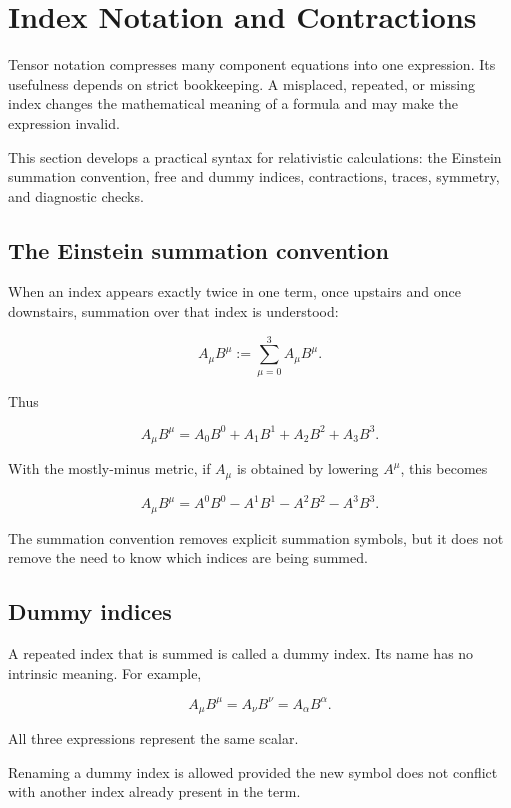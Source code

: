 \section{Index Notation and Contractions}
\label{sec:index_notation_and_contractions}

Tensor notation compresses many component equations into one expression. Its usefulness depends on strict bookkeeping. A misplaced, repeated, or missing index changes the mathematical meaning of a formula and may make the expression invalid.

This section develops a practical syntax for relativistic calculations: the Einstein summation convention, free and dummy indices, contractions, traces, symmetry, and diagnostic checks.

\subsection{The Einstein summation convention}

When an index appears exactly twice in one term, once upstairs and once downstairs, summation over that index is understood:

\[
A_{\mu}B^{\mu}
:=
\sum_{\mu=0}^{3}
A_{\mu}B^{\mu}.
\]

Thus

\[
A_{\mu}B^{\mu}
=
A_{0}B^{0}
+A_{1}B^{1}
+A_{2}B^{2}
+A_{3}B^{3}.
\]

With the mostly-minus metric, if \(A_{\mu}\) is obtained by lowering \(A^{\mu}\), this becomes

\[
A_{\mu}B^{\mu}
=
A^{0}B^{0}
-
A^{1}B^{1}
-
A^{2}B^{2}
-
A^{3}B^{3}.
\]

The summation convention removes explicit summation symbols, but it does not remove the need to know which indices are being summed.

\subsection{Dummy indices}

A repeated index that is summed is called a dummy index. Its name has no intrinsic meaning. For example,

\[
A_{\mu}B^{\mu}
=
A_{\nu}B^{\nu}
=
A_{\alpha}B^{\alpha}.
\]

All three expressions represent the same scalar.

Renaming a dummy index is allowed provided the new symbol does not conflict with another index already present in the term.

